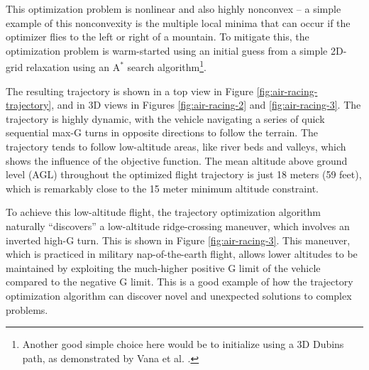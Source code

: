 This optimization problem is nonlinear and also highly nonconvex -- a simple example of this nonconvexity is the multiple local minima that can occur if the optimizer flies to the left or right of a mountain. To mitigate this, the optimization problem is warm-started using an initial guess from a simple 2D-grid relaxation using an $\mathrm{A}^*$ search algorithm\footnote{Another good simple choice here would be to initialize using a 3D Dubins path, as demonstrated by Vana et al. \cite{vana20minimal}.}.

The resulting trajectory is shown in a top view in Figure \ref{fig:air-racing-trajectory}, and in 3D views in Figures \ref{fig:air-racing-2} and \ref{fig:air-racing-3}. The trajectory is highly dynamic, with the vehicle navigating a series of quick sequential max-G turns in opposite directions to follow the terrain. The trajectory tends to follow low-altitude areas, like river beds and valleys, which shows the influence of the objective function. The mean altitude above ground level (AGL) throughout the optimized flight trajectory is just 18 meters (59 feet), which is remarkably close to the 15 meter minimum altitude constraint.

To achieve this low-altitude flight, the trajectory optimization algorithm naturally ``discovers'' a low-altitude ridge-crossing maneuver, which involves an inverted high-G turn. This is shown in Figure \ref{fig:air-racing-3}. This maneuver, which is practiced in military nap-of-the-earth flight, allows lower altitudes to be maintained by exploiting the much-higher positive G limit of the vehicle compared to the negative G limit. This is a good example of how the trajectory optimization algorithm can discover novel and unexpected solutions to complex problems.


